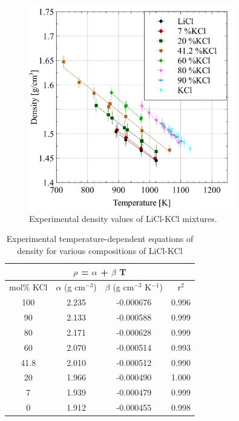 \documentclass[review]{elsarticle}
\begin{document}
\begin{figure}[h]
 \centering
 \includegraphics[width=0.8\textwidth]{images/density_exp.jpg} 
 \caption{Experimental density values of LiCl-KCl mixtures.}
 \label{fig:density_exp}
\end{figure} 

\begin{table}[h]
\centering
\caption{Experimental temperature-dependent equations of density for various compositions of LiCl-KCl}
\begin{tabular}{|c|c|c|c|}
\hline
\multicolumn{4}{|c|}{$\rho$ = $\alpha$ + $\beta$ T} \\
\hline
mol\% KCl & $\alpha$ (g cm$^{-3}$) & $\beta$ (g cm$^{-3}$ K$^{-1}$) & r$^{2}$\\
\hline
100       & 2.235         & -0.000676        & 0.996 \\
90        & 2.133         & -0.000588        & 0.999 \\
80        & 2.171         & -0.000628        & 0.999 \\
60        & 2.070         & -0.000514        & 0.993 \\
41.8      & 2.010         & -0.000512        & 0.990 \\
20        & 1.966         & -0.000490        & 1.000 \\
7         & 1.939         & -0.000479        & 0.999 \\
0         & 1.912         & -0.000455        & 0.998 \\
\hline
\end{tabular}
\label{table1}
\end{table}
\end{document}
